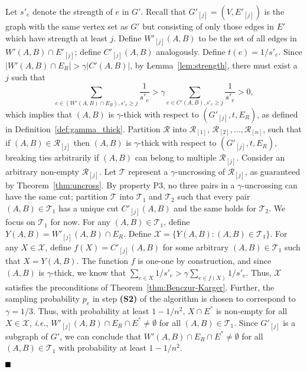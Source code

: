 \documentclass[11pt]{article}
\newcommand{\qed}{\mbox{}\hspace*{\fill}\nolinebreak\mbox{$\rule{0.6em}{0.6em}$}
}
\newenvironment{proof}{{\bf Proof:}}{$\qed$\par}
\newcommand{\coll}{{\mathcal R}}
\newcommand{\colltwo}{{\mathcal T}}
\newcommand{\edgesets}{\mathcal X}
\begin{document}
\begin{proof}
  Let $s'_e$ denote the strength of $e$ in $G'$. Recall that
  $G'_{[j]}=(V,E'_{[j]})$ is the graph with the same vertex set as $G'$ but
  consisting of only those edges in $E'$ which have strength at least
  $j$. Define $W'_{[j]}(A,B)$ to be the set of all edges in $W'(A,B) \cap E'_{[j]}$;
  define $C'_{[j]}(A,B)$ analogously. Define $t(e) =
  1/s'_e$. Since $ |W'(A,B) \cap E_R| > \gamma |C'(A,B)|$, by
  Lemma~\ref{lem:strength}, there must exist a $j$ such that
  $$\sum_{e\in
    (W'(A,B) \cap E_R), s'_e \ge j} \frac{1}{s'_e} > \gamma \sum_{e\in C'(A,B), s'_e
    \ge j} \frac{1}{s'_e} > 0,$$
  which implies that $(A,B)$ is $\gamma$-thick with
  respect to $(G'_{[j]}, t, E_R)$, as defined in Definition~\ref{def:gamma_thick}.
  Partition $\coll$ into $\coll_{[1]}$,
  $\coll_{[2]}, \ldots, \coll_{[n]}$, such that if $(A,B)\in \coll_{[j]}$ then
  $(A,B)$ is $\gamma$-thick with respect to $(G'_{[j]}, t, E_R)$, breaking
  ties arbitrarily if $(A,B)$ can belong to multiple $\coll_{[j]}$. Consider
  an arbitrary non-empty $\coll_{[j]}$. Let $\colltwo$ represent a
  $\gamma$-uncrossing of $\coll_{[j]}$, as guaranteed by
  Theorem~\ref{thm:uncross}. By property P3, no three pairs in a
  $\gamma$-uncrossing can have the same cut; partition $\colltwo$ into
  $\colltwo_1$ and $\colltwo_2$ such that every pair $(A,B) \in \colltwo_1$
  has a unique cut $C'_{[j]}(A,B)$ and the same holds for $\colltwo_2$. We
  focus on $\colltwo_1$ for now. For any $(A,B)\in\colltwo_1$, define $Y(A,B)
  = W'_{[j]}(A,B)\cap E_R$. Define $\edgesets = \{Y(A,B): (A,B)\in
  \colltwo_1\}$. For any $X\in \edgesets$, define $f(X) = C'_{[j]}(A,B)$ for
  some arbitrary $(A,B)\in \colltwo_1$ such that $X=Y(A,B)$. The function $f$
  is one-one by construction, and since $(A,B)$ is $\gamma$-thick, we know
  that $\sum_{e\in X} 1/s'_e > \gamma \sum_{e\in f(X)} 1/s'_e$. Thus,
  $\edgesets$ satisfies the preconditions of
  Theorem~\ref{thm:Benczur-Karger}. Further, the sampling probability $p_e$ in
  step {\bf(S2)} of the algorithm is chosen to correspond to
  $\gamma=1/3$. Thus, with probability at least $1-1/n^2$, $X\cap E^{''}$ is
  non-empty for all $X\in \edgesets$, {\em i.e.}, $W'_{[j]}(A,B) \cap E_R \cap
  E^{''}\neq \emptyset$ for all $(A,B) \in \colltwo_1$. Since $G'_{[j]}$ is a
  subgraph of $G'$, we can conclude that $W'(A,B) \cap E_R \cap E^{''}\neq
  \emptyset$ for all $(A,B) \in \colltwo_1$ with probability at least
  $1-1/n^2$.


\end{proof}
\end{document}
